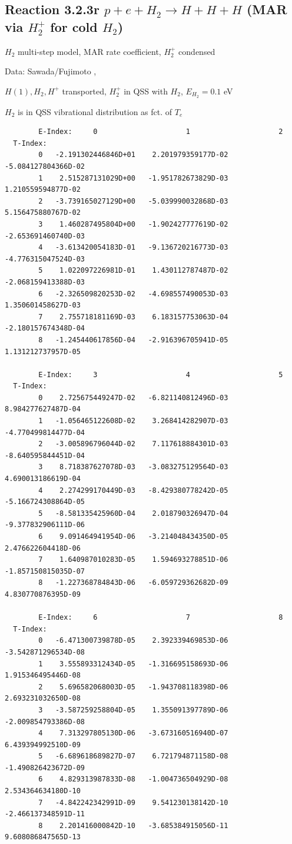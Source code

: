 \documentclass[12pt,dvips]{article}
\begin{document}
\subsection{
Reaction 3.2.3r   $p + e+ H_2   \rightarrow H + H + H  $ (MAR via $H_2^+$ for cold $H_2$)
}

$H_2$ multi-step model, MAR rate coefficient, $H_2^+$ condensed

 Data: Sawada/Fujimoto ,\cite{kn:Sawada}

$  H(1), H_2, H^+ $ transported, $H_2^+$ in QSS with $H_2$, $E_{H_2}=0.1$ eV


$H_2$ is in QSS vibrational distribution as fct. of $T_e$


\begin{small}\begin{verbatim}
        E-Index:     0                     1                     2
  T-Index:
        0   -2.191302446846D+01    2.201979359177D-02   -5.084127804366D-02
        1    2.515287131029D+00   -1.951782673829D-03    1.210559594877D-02
        2   -3.739165027129D+00   -5.039990032868D-03    5.156475880767D-02
        3    1.460287495804D+00   -1.902427777619D-02   -2.653691460740D-03
        4   -3.613420054183D-01   -9.136720216773D-03   -4.776315047524D-03
        5    1.022097226981D-01    1.430112787487D-02   -2.068159413388D-03
        6   -2.326509820253D-02   -4.698557490053D-03    1.350601458627D-03
        7    2.755718181169D-03    6.183157753063D-04   -2.180157674348D-04
        8   -1.245440617856D-04   -2.916396705941D-05    1.131212737957D-05

        E-Index:     3                     4                     5
  T-Index:
        0    2.725675449247D-02   -6.821140812496D-03    8.984277627487D-04
        1   -1.056465122608D-02    3.268414282907D-03   -4.770499814477D-04
        2   -3.005896796044D-02    7.117618884301D-03   -8.640595844451D-04
        3    8.718387627078D-03   -3.083275129564D-03    4.690013186619D-04
        4    2.274299170449D-03   -8.429380778242D-05   -5.166724308864D-05
        5   -8.581335425960D-04    2.018790326947D-04   -9.377832906111D-06
        6    9.091464941954D-06   -3.214048434350D-05    2.476622604418D-06
        7    1.640987010283D-05    1.594693278851D-06   -1.857150815035D-07
        8   -1.227368784843D-06   -6.059729362682D-09    4.830770876395D-09

        E-Index:     6                     7                     8
  T-Index:
        0   -6.471300739878D-05    2.392339469853D-06   -3.542871296534D-08
        1    3.555893312434D-05   -1.316695158693D-06    1.915346495446D-08
        2    5.696582068003D-05   -1.943708118398D-06    2.693231032650D-08
        3   -3.587259258804D-05    1.355091397789D-06   -2.009854793386D-08
        4    7.313297805130D-06   -3.673160516940D-07    6.439394992510D-09
        5   -6.689618689827D-07    6.721794871158D-08   -1.490826423672D-09
        6    4.829313987833D-08   -1.004736504929D-08    2.534364634180D-10
        7   -4.842242342991D-09    9.541230138142D-10   -2.466137348591D-11
        8    2.201416000842D-10   -3.685384915056D-11    9.608086847565D-13


\end{verbatim}
\end{small}
\end{document}
